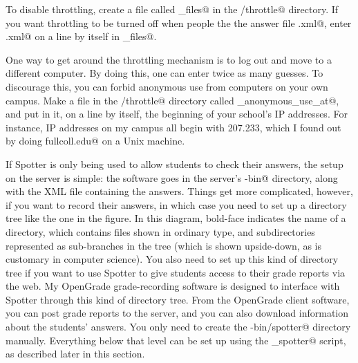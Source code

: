 \documentclass{doc}
\begin{document}
To disable throttling, create a file called \verb@exempt_files@ in the
\verb@spotter/throttle@ directory. If you want throttling to be turned
off when people the the answer file \verb@foo.xml@, enter \verb@foo.xml@
on a line by itself in \verb@exempt_files@.

One way to get around the throttling mechanism is to log out and move to
a different computer. By doing this, one can enter twice as many guesses.
To discourage this, you can forbid anonymous use from computers on your
own campus. Make a file in the \verb@spotter/throttle@ directory called
\verb@forbid_anonymous_use_at@, and put in it, on a line by itself,
the beginning of your school's IP addresses. For instance, IP
addresses on my campus all begin with 207.233, which I found out by
doing \verb@dig fullcoll.edu@ on a Unix machine.


If Spotter is only being used to allow students to check their answers, the
setup on the server is simple: the software goes in the server's \verb@cgi-bin@
directory, along with the XML file containing the answers. Things get more
complicated, however, if you want to record their answers, in which case
you need to set up a directory tree like the one in the figure. In this
diagram, bold-face indicates the name of a directory, which contains files
shown in ordinary type, and subdirectories represented as sub-branches in
the tree (which is shown upside-down, as is customary in computer science).
You also need to set up this kind of directory tree if you want to use Spotter
to give students access to their grade reports via the web. My OpenGrade
grade-recording software is designed to interface with Spotter through this
kind of directory tree. From the OpenGrade client software, you 
can post grade reports to the server, and you can also download information
about the students' answers. You only need to create the \verb@cgi-bin/spotter@
directory manually. Everything below that level can be set up using the
\verb@admin_spotter@ script, as described later in this section.
\end{document}
